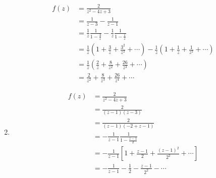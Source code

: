 \documentclass{article}
\begin{document}
\begin{enumerate}
        \begin{align*}
          f(z) & = \frac{2}{z^2 - 4 z + 3}                                                                                                                     \\
               & = \frac{1}{z - 3} - \frac{1}{z - 1}                                                                                                           \\
               & = \frac{1}{z} \frac{1}{1 - \frac{3}{z}} - \frac{1}{z} \frac{1}{1 - \frac{1}{z}}                                                               \\
               & = \frac{1}{z} \left( 1 + \frac{3}{z} + \frac{3^2}{z^2} + \cdots \right) - \frac{1}{z} \left( 1 + \frac{1}{z} + \frac{1}{z^2} + \cdots \right) \\
               & = \frac{1}{z} \left( \frac{2}{z} + \frac{8}{z^2} + \frac{26}{z^3} + \cdots \right)                                                            \\
               & = \frac{2}{z^2} + \frac{8}{z^3} + \frac{26}{z^4} + \cdots
        \end{align*}

  \item

        \begin{align*}
          f(z) & = \frac{2}{z^2 - 4 z + 3}                                                              \\
               & = \frac{2}{(z - 1) (z - 3)}                                                            \\
               & = \frac{2}{(z - 1) (-2 + z - 1)}                                                       \\
               & = -\frac{1}{z - 1} \frac{1}{1 - \frac{z - 1}{2}}                                       \\
               & = -\frac{1}{z - 1} \left[ 1 + \frac{z - 1}{2} + \frac{(z - 1)^2}{2^2} + \cdots \right] \\
               & = -\frac{1}{z - 1} - \frac{1}{2} - \frac{z - 1}{2^2} - \cdots
        \end{align*}
\end{enumerate}

\setcounter{subsubsection}{20}
\subsubsection{}
\end{document}
